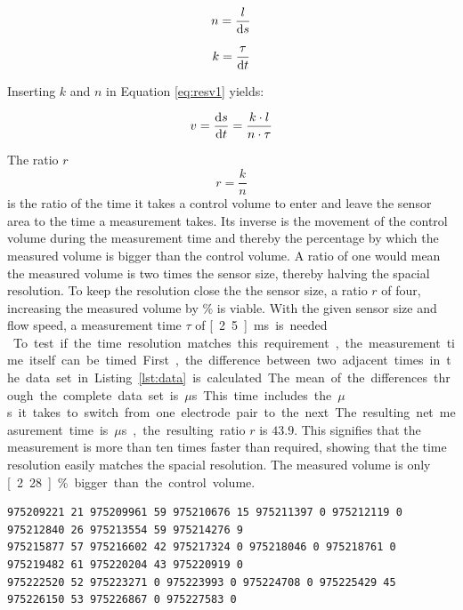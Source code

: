 \begin{equation}
	n = \dfrac{l}{\mathop{}\!\mathrm{d} s}
\label{eq:resn} 
\end{equation}

\begin{equation}
	k = \dfrac{ \tau}{\mathop{}\!\mathrm{d} t}
\label{eq:resk}
\end{equation}

Inserting $ k $ and $ n $ in Equation \eqref{eq:resv1} yields:

\begin{equation}
	v = \dfrac{\mathop{}\!\mathrm{d} s}{\mathop{}\!\mathrm{d} t} = \dfrac{k \cdot l}{n \cdot \tau}
\label{eq:resv1} 
\end{equation}

The ratio $ r $
\begin{equation}
	r = \frac{k}{n}
\label{eq:resr} 
\end{equation}
is the ratio of the time it takes a control volume to enter and leave the sensor area  to the time a measurement takes. Its inverse is the movement of the control volume during the measurement time and thereby the percentage by which the measured volume is bigger than the control volume. A ratio of one would mean the measured volume is two times the sensor size, thereby halving the spacial resolution. To keep the resolution close the the sensor size, a ratio $r$ of four, increasing the measured volume by \unit[25]{\%} is viable.
With the given sensor size and flow speed, a measurement time $ \tau $ of \unit[2.5]{ms} is needed.\\

To test if the time resolution matches this requirement, the measurement time itself can be timed. First, the difference between two adjacent times in the data set in Listing \ref{lst:data} is calculated. The mean of the differences through the complete data set is \unit[748]{$\mu$s}. This time includes the \unit[520]{$\mu$s} it takes to switch from one electrode pair to the next. The resulting net measurement time is \unit[228]{$\mu$s}, the resulting ratio $r$ is $43.9$. This signifies that the measurement is more than ten times faster than required, showing that the time resolution easily matches the spacial resolution. The measured volume is only \unit[2.28]{\%} bigger than the control volume.

\begin{lstlisting}[caption={An excerpt of measurement data showing three lines of data from eight sensors. The long numbers are the times at which the measurements were taken in microseconds measured from the start, the short numbers are the measured values.},label={lst:data}]
975209221 21 975209961 59 975210676 15 975211397 0 975212119 0 975212840 26 975213554 59 975214276 9 
975215877 57 975216602 42 975217324 0 975218046 0 975218761 0 975219482 61 975220204 43 975220919 0 
975222520 52 975223271 0 975223993 0 975224708 0 975225429 45 975226150 53 975226867 0 975227583 0  
\end{lstlisting}

